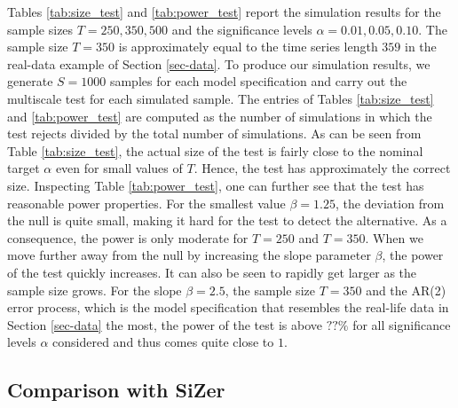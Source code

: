 Tables \ref{tab:size_test} and \ref{tab:power_test} report the simulation results for the sample sizes $T=250,350,500$ and the significance levels $\alpha = 0.01, 0.05, 0.10$. The sample size $T = 350$ is approximately equal to the time series length $359$ in the real-data example of Section \ref{sec-data}. To produce our simulation results, we generate $S=1000$ samples for each model specification and carry out the multiscale test for each simulated sample. The entries of Tables \ref{tab:size_test} and \ref{tab:power_test} are computed as the number of simulations in which the test rejects divided by the total number of simulations. As can be seen from Table \ref{tab:size_test}, the actual size of the test is fairly close to the nominal target $\alpha$ even for small values of $T$. Hence, the test has approximately the correct size. Inspecting Table \ref{tab:power_test}, one can further see that the test has reasonable power properties. For the smallest value $\beta = 1.25$, the deviation from the null is quite small, making it hard for the test to detect the alternative. As a consequence, the power is only moderate for $T=250$ and $T=350$. When we move further away from the null by increasing the slope parameter $\beta$, the power of the test quickly increases. It can also be seen to rapidly get larger as the sample size grows. For the slope $\beta =2.5$, the sample size $T=350$ and the AR(2) error process, which is the model specification that resembles the real-life data in Section \ref{sec-data} the most, the power of the test is above $??\%$ for all significance levels $\alpha$ considered and thus comes quite close to $1$. 




\subsection{Comparison with SiZer}\label{subsec-sim-2}


